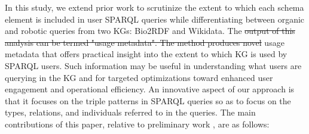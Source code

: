 \documentclass[sw]{iosart2x}
\providecommand{\DIFadd}[1]{{\protect\color{blue}\uwave{#1}}} %
\providecommand{\DIFdel}[1]{{\protect\color{red}\sout{#1}}} %
\providecommand{\DIFaddbegin}{} %
\providecommand{\DIFaddend}{} %
\providecommand{\DIFdelbegin}{} %
\providecommand{\DIFdelend}{} %
\providecommand{\DIFscaledelfig}{0.5}
\newlength{\DIFdelgraphicswidth} %
\newlength{\DIFdelgraphicsheight} %
\providecommand{\DIFaddincludegraphics}[2][]{{\color{blue}\fbox{\DIFOincludegraphics[#1]{#2}}}} %
\providecommand{\DIFdelincludegraphics}[2][]{%
\sbox{\DIFdelgraphicsbox}{\DIFOincludegraphics[#1]{#2}}%
\settoboxwidth{\DIFdelgraphicswidth}{\DIFdelgraphicsbox} %
\settoboxtotalheight{\DIFdelgraphicsheight}{\DIFdelgraphicsbox} %
\scalebox{\DIFscaledelfig}{%
\parbox[b]{\DIFdelgraphicswidth}{\usebox{\DIFdelgraphicsbox}\\[-\baselineskip] \rule{\DIFdelgraphicswidth}{0em}}\llap{\resizebox{\DIFdelgraphicswidth}{\DIFdelgraphicsheight}{%
\setlength{\unitlength}{\DIFdelgraphicswidth}%
\begin{picture}(1,1)%
\thicklines\linethickness{2pt} %
{\color[rgb]{1,0,0}\put(0,0){\framebox(1,1){}}}%
{\color[rgb]{1,0,0}\put(0,0){\line( 1,1){1}}}%
{\color[rgb]{1,0,0}\put(0,1){\line(1,-1){1}}}%
\end{picture}%
}\hspace*{3pt}}} %
} %
\DeclareRobustCommand{\DIFaddbegin}{\DIFOaddbegin \let\includegraphics\DIFaddincludegraphics} %
\DeclareRobustCommand{\DIFaddend}{\DIFOaddend \let\includegraphics\DIFOincludegraphics} %
\DeclareRobustCommand{\DIFdelbegin}{\DIFOdelbegin \let\includegraphics\DIFdelincludegraphics} %
\DeclareRobustCommand{\DIFdelend}{\DIFOaddend \let\includegraphics\DIFOincludegraphics} %
\begin{document}
In this study, we extend prior work \cite{mohammadi2024analyzing} to scrutinize the extent to which each schema element is included in user SPARQL queries while differentiating between organic and robotic queries from two KGs: Bio2RDF and Wikidata. The \DIFdelbegin \DIFdel{output of this analysis can be termed "usage metadata". The method produces novel }\DIFdelend \DIFaddbegin \DIFadd{method produces }\DIFaddend usage metadata that offers practical insight into the extent to which KG is used by SPARQL users. Such information may be useful in understanding what users are querying in the KG and for targeted optimizations toward enhanced user engagement and operational efficiency. 
An innovative aspect of our approach is that it focuses on the triple patterns in SPARQL queries so as to focus on the types, relations, and individuals referred to in the queries. The main contributions of this paper, relative to preliminary work \cite{mohammadi2024analyzing}, are as follows:
\end{document}
